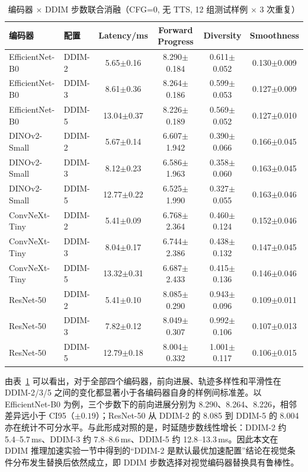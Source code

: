 \begin{table}[htbp]
    \centering
    \small
    \caption{编码器 $\times$ DDIM 步数联合消融（CFG=0, 无 TTS, 12 组测试样例 $\times$ 3 次重复）}
    \label{tab:encoder-ddim-joint}
    \begin{tabular}{llcccc}
        \toprule
        编码器 & 配置 & Latency/ms & Forward Progress & Diversity & Smoothness \\
        \midrule
        EfficientNet-B0 & DDIM-2 & 5.65$\pm$0.16 & 8.290$\pm$0.184 & 0.611$\pm$0.052 & 0.130$\pm$0.009 \\
        EfficientNet-B0 & DDIM-3 & 8.61$\pm$0.36 & 8.264$\pm$0.186 & 0.599$\pm$0.053 & 0.127$\pm$0.009 \\
        EfficientNet-B0 & DDIM-5 & 13.04$\pm$0.37 & 8.226$\pm$0.189 & 0.569$\pm$0.052 & 0.127$\pm$0.010 \\
        DINOv2-Small & DDIM-2 & 5.67$\pm$0.14 & 6.607$\pm$1.942 & 0.390$\pm$0.066 & 0.166$\pm$0.045 \\
        DINOv2-Small & DDIM-3 & 8.12$\pm$0.23 & 6.586$\pm$1.963 & 0.358$\pm$0.060 & 0.163$\pm$0.045 \\
        DINOv2-Small & DDIM-5 & 12.77$\pm$0.22 & 6.525$\pm$1.990 & 0.327$\pm$0.055 & 0.163$\pm$0.046 \\
        ConvNeXt-Tiny & DDIM-2 & 5.41$\pm$0.09 & 6.768$\pm$2.364 & 0.460$\pm$0.124 & 0.152$\pm$0.046 \\
        ConvNeXt-Tiny & DDIM-3 & 8.04$\pm$0.17 & 6.744$\pm$2.386 & 0.438$\pm$0.132 & 0.147$\pm$0.045 \\
        ConvNeXt-Tiny & DDIM-5 & 13.32$\pm$0.31 & 6.687$\pm$2.433 & 0.415$\pm$0.136 & 0.146$\pm$0.046 \\
        ResNet-50 & DDIM-2 & 5.41$\pm$0.10 & 8.085$\pm$0.290 & 0.943$\pm$0.096 & 0.109$\pm$0.011 \\
        ResNet-50 & DDIM-3 & 7.82$\pm$0.12 & 8.049$\pm$0.307 & 0.992$\pm$0.106 & 0.107$\pm$0.013 \\
        ResNet-50 & DDIM-5 & 12.79$\pm$0.18 & 8.004$\pm$0.332 & 1.001$\pm$0.117 & 0.106$\pm$0.015 \\
        \bottomrule
    \end{tabular}
\end{table}

由表~\ref{tab:encoder-ddim-joint} 可以看出，对于全部四个编码器，前向进展、轨迹多样性和平滑性在 DDIM-2/3/5 之间的变化都显著小于各编码器自身的样例间标准差。以 EfficientNet-B0 为例，三个步数下的前向进展分别为 8.290、8.264、8.226，相邻差异远小于 CI95（$\pm0.19$）；ResNet-50 从 DDIM-2 的 8.085 到 DDIM-5 的 8.004 亦在统计不可分水平。与此形成对照的是，时延随步数线性增长：DDIM-2 约 5.4--5.7\,ms、DDIM-3 约 7.8--8.6\,ms、DDIM-5 约 12.8--13.3\,ms。因此本文在 DDIM 推理加速实验一节中得到的``DDIM-2 是默认最优加速配置''结论在视觉条件分布发生替换后依然成立，即 DDIM 步数选择对视觉编码器替换具有鲁棒性。

